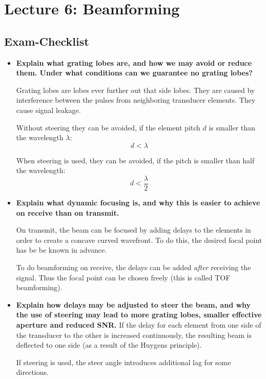 \documentclass[10pt,a4paper,noendnumber=true]{scrartcl}
\begin{document}
\newpage
\section{Lecture 6: Beamforming}

\subsection{Exam-Checklist}
\begin{itemize}
\item \textbf{Explain what grating lobes are, and how we may avoid or reduce them. Under what conditions can we guarantee no grating lobes?}

Grating lobes are lobes ever further out that side lobes. They are caused by interference between the pulses from neighboring transducer elements. They cause signal leakage.

Without steering they can be avoided, if the element pitch $d$ is smaller than the wavelength $\lambda$:
\begin{equation}
d<\lambda
\end{equation}

When steering is used, they can be avoided, if the pitch is smaller than half the wavelength:
\begin{equation}
d<\frac{\lambda}{2}
\end{equation}

\item \textbf{Explain what dynamic focusing is, and why this is easier to achieve on receive than on transmit.}

On transmit, the beam can be focused by adding delays to the elements in order to create a concave curved wavefront. To do this, the desired focal point has be be known in advance.

To do beamforming on receive, the delays can be added \textit{after} receiving the signal. Thus the focal point can be chosen freely (this is called TOF beamforming).


\item \textbf{Explain how delays may be adjusted to steer the beam, and why the use of steering may lead to more grating lobes, smaller effective aperture and reduced SNR.}
If the delay for each element from one side of the transducer to the other is increased continuously, the resulting beam is deflected to one side (as a result of the Huygens principle).

If steering is used, the steer angle introduces additional lag for some directions.


\end{itemize}
\end{document}
